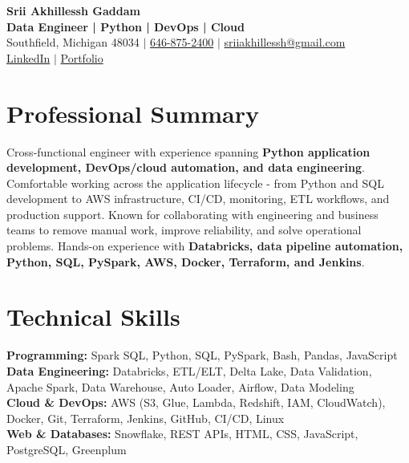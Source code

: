 \documentclass[letterpaper,10pt]{article}
\begin{document}
\fontsize{9.35pt}{10.45pt}\selectfont

\begin{center}
    {\LARGE \textbf{Srii Akhillessh Gaddam}} \\[-1pt]
    \textbf{Data Engineer | Python | DevOps | Cloud} \\[2pt]
    Southfield, Michigan 48034 $|$
    \href{tel:6468752400}{646-875-2400} $|$
    \href{mailto:sriiakhillessh@gmail.com}{sriiakhillessh@gmail.com} \\[1pt]
    \href{https://www.linkedin.com/in/srii-akhiilessh-gaddam-b48668191/}{LinkedIn} $|$
    \href{https://sriiakhillesshg.github.io/portfolio/}{Portfolio}
\end{center}
\vspace{-8pt}

\section{Professional Summary}
\small{Cross-functional engineer with experience spanning \textbf{Python application development, DevOps/cloud automation, and data engineering}. Comfortable working across the application lifecycle - from Python and SQL development to AWS infrastructure, CI/CD, monitoring, ETL workflows, and production support. Known for collaborating with engineering and business teams to remove manual work, improve reliability, and solve operational problems. Hands-on experience with \textbf{Databricks, data pipeline automation, Python, SQL, PySpark, AWS, Docker, Terraform, and Jenkins}.}

\section{Technical Skills}
\small{
\textbf{Programming:} Spark SQL, Python, SQL, PySpark, Bash, Pandas, JavaScript \\
\textbf{Data Engineering:} Databricks, ETL/ELT, Delta Lake, Data Validation, Apache Spark, Data Warehouse, Auto Loader, Airflow, Data Modeling \\
\textbf{Cloud \& DevOps:} AWS (S3, Glue, Lambda, Redshift, IAM, CloudWatch), Docker, Git, Terraform, Jenkins, GitHub, CI/CD, Linux \\
\textbf{Web \& Databases:} Snowflake, REST APIs, HTML, CSS, JavaScript, PostgreSQL, Greenplum
}
\end{document}
